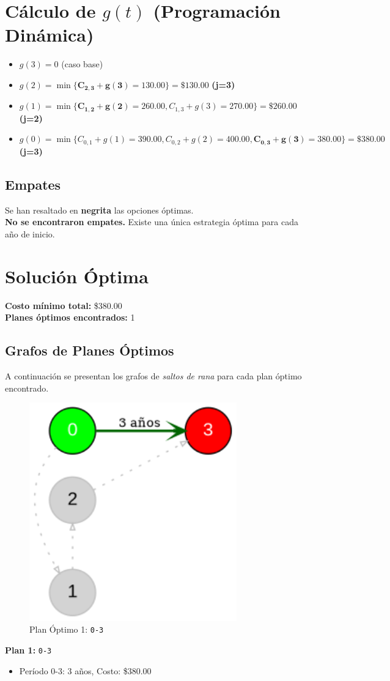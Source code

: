 \documentclass[12pt]{article}
\begin{document}
\clearpage
\section*{Cálculo de $g(t)$ (Programación Dinámica)}
\begin{itemize}
\item $g(3) = 0$ (caso base)
\item $g(2) = \min\{ \mathbf{C_{2,3} + g(3) = 130.00}\} = \$130.00$ \textbf{(j=3)}
\item $g(1) = \min\{ \mathbf{C_{1,2} + g(2) = 260.00}, C_{1,3} + g(3) = 270.00\} = \$260.00$ \textbf{(j=2)}
\item $g(0) = \min\{ C_{0,1} + g(1) = 390.00, C_{0,2} + g(2) = 400.00, \mathbf{C_{0,3} + g(3) = 380.00}\} = \$380.00$ \textbf{(j=3)}
\end{itemize}

\subsection*{Empates}
Se han resaltado en \textbf{negrita} las opciones óptimas.\\
\textbf{No se encontraron empates.} Existe una única estrategia óptima para cada año de inicio.\\
\clearpage
\section*{Solución Óptima}
\textbf{Costo mínimo total:} \$380.00\\
\textbf{Planes óptimos encontrados:} 1
\subsection*{Grafos de Planes Óptimos}
A continuación se presentan los grafos de \emph{saltos de rana} para cada plan óptimo encontrado.

\begin{figure}[H]
\centering
\includegraphics[width=0.8\textwidth]{Reemplazo_Bici_plan_1.png}
\caption{Plan Óptimo 1: \texttt{0-3}}
\label{fig:plan1}
\end{figure}

\textbf{Plan 1:} \texttt{0-3}
\begin{itemize}\small
\item Período 0-3: 3 años, Costo: \$380.00
\end{itemize}
\end{document}
